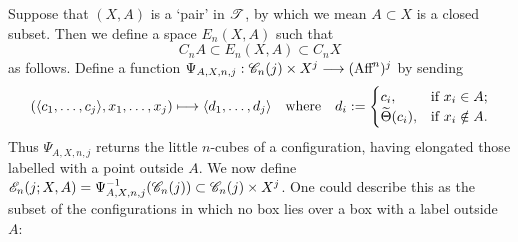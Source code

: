 \documentclass[11pt]{article}
\newcommand{\Aff}{\textup{Aff}}
\newcommand{\labsq}[6][0]{
\draw (#2+#1,#3)--(#4+#1,#3)--(#4+#1,#5)--(#2+#1,#5)-- cycle;
\path (.5*#2+.5*#4+#1,.5*#3+.5*#5) node[font=\scriptsize] {#6};
}
\begin{document}
\begin{chapter4-6}
Suppose that $(X,A)$ is a `pair' in $\scrT$, by which we mean $A\subset X$ is a closed subset. Then we define a space $E_n(X,A)$ such that
\[C_nA\subset E_n(X,A)\subset C_nX\]
as follows. Define a function $\Psi_{A,X,n,j}:\scrC_n(j)\times X^j\to(\Aff^n)^j$ by sending
\[(\langle c_1,\ldots,c_j\rangle,x_1,\ldots,x_j)\mapsto\langle d_1,\ldots,d_j\rangle
\textup{\quad where\quad }d_i:=\begin{cases}
c_i,&\textup{if }x_i\in A;\\
\widetilde{\Theta}(c_i),&\textup{if }x_i\notin A.
\end{cases}\]
Thus $\Psi_{A,X,n,j}$ returns the little $n$-cubes of a configuration, having elongated those labelled with a point outside $A$. We now define $\scrE_n(j;X,A)=\Psi_{A,X,n,j}^{-1}(\scrC_n(j))\subset \scrC_n(j)\times X^j$. One could describe this as the subset of the configurations in which no box lies over a box with a label outside $A$:
\begin{center}
\end{center}
\end{chapter4-6}
\end{document}
